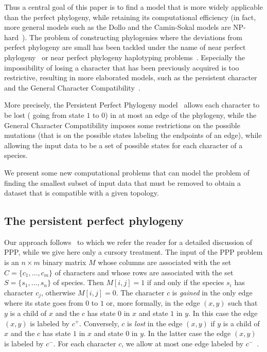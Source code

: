 Thus a central goal of this paper  is to find a model that is more
widely applicable than the perfect phylogeny, while retaining  its computational
efficiency (in fact, more general models such as the Dollo and the Camin-Sokal
models are NP-hard~\cite{felsenstein:inferring-phylogenies}).
The problem of constructing  phylogenies where the deviations from perfect phylogeny are  small
has been tackled under the name of near perfect
phylogeny~\cite{DBLP:journals-siamcomp-Fernandez-BacaL03} or near perfect
phylogeny  haplotyping  problems~\cite{DBLP:conf-ismb-SatyaMAPB06}.
Especially the impossibility of losing a character that has been previously
acquired is too restrictive, resulting in more elaborated models,
such as the persistent character~\cite{Pr1} and the General Character
Compatibility~\cite{DBLP:conf-isbra-ManuchPG11,mavnuch2009generalised}.

More precisely, the  Persistent Perfect Phylogeny
model~\cite{DBLP:journals-tcs-BonizzoniBDT12} allows each character to be lost
(\ie{} going from state $1$ to $0$) in at most an edge of the phylogeny, while the
General Character Compatibility imposes some restrictions on the possible
mutations (that is on the possible states labeling the endpoints of an edge),
while allowing the input data to be a set of possible states for each character
of a species.

We present some new computational problems that can model the problem
of finding the smallest subset of input data that must be removed to
obtain a dataset that is compatible with a given topology.




\subsection*{The persistent perfect phylogeny}

Our approach follows~\cite{DBLP:journals-tcs-BonizzoniBDT12} to which we refer
the reader for a detailed discussion of PPP, while we give here
only a cursory treatment.
The input of the PPP problem is an  $n \times m$ binary matrix $M$ whose
columns are associated with the set $C  = \{c_1, \ldots,
c_m\}$ of characters and whose rows are associated with the set $S = \{s_1, \dots,
s_n\}$ of species.
Then $M[i,j] = 1$ if and
only if the species $s_i$ has character $c_j$, otherwise $M[i,j] = 0$.
The character $c$ is \emph{gained} in the only edge where its state goes from $0$ to
$1$ or, more formally, in the edge $(x,y)$ such that $y$ is a child of $x$ and
the $c$ has state $0$ in $x$ and state $1$ in $y$.
In this case the edge $(x,y)$ is labeled by $c^{+}$.
Conversely, $c$ is \emph{lost} in the edge $(x,y)$ if $y$ is a child of $x$ and
the $c$ has state $1$ in $x$ and state $0$ in $y$.
In the latter case the edge $(x,y)$ is labeled by $c^{-}$.
For each character $c$, we allow at most one edge labeled by $c^{-}$~\cite{zeng,DBLP:journals-tcs-BonizzoniBDT12}.


